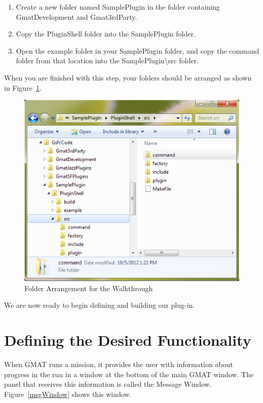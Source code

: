 \documentclass[10pt,letterpaper]{article}
\begin{document}
\begin{enumerate}
\item Create a new folder named SamplePlugin in the folder containing GmatDevelopment and Gmat3rdParty.
\item Copy the PluginShell folder into the SamplePlugin folder.
\item Open the example folder in your SamplePlugin folder, and copy the command folder from that location into the SamplePlugin{\textbackslash}src folder. 
\end{enumerate} 

\noindent When you are finished with this step, your folders should be arranged as shown in Figure~\ref{folderConfig}.

\begin{figure}[htb]
\begin{center}
\includegraphics[scale=.5]{images/FolderConfiguration.png}
\caption{\label{folderConfig}Folder Arrangement for the Walkthrough}
\end{center}
\end{figure}

\noindent We are now ready to begin defining and building our plug-in.

\section{Defining the Desired Functionality}

When GMAT runs a mission, it provides the user with information about progress in the run in a window at the bottom of the main GMAT window.  The panel that receives this information is called the Message Window.  Figure~\ref{msgWindow} shows this window.
\end{document}
